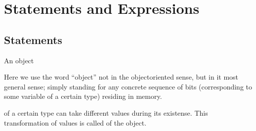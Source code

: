 \documentclass[a4paper,10pt,english]{jupyterBook}
\begin{document}
\begin{sphinxVerbatim}[commandchars=\\\{\}]


\end{sphinxVerbatim}

\ignorespaces 
\sphinxstepscope


\section{Statements and Expressions}
\label{\detokenize{text/progtut/statements:statements-and-expressions}}\label{\detokenize{text/progtut/statements::doc}}

\subsection{Statements}
\label{\detokenize{text/progtut/statements:statements}}
\sphinxAtStartPar
An object %
\begin{footnote}[1]\sphinxAtStartFootnote
Here we use the word “object” not in the object\sphinxhyphen{}oriented sense, but in it most general sense; simply standing for any concrete sequence of bits (corresponding to some variable of a certain type) residing in memory.
%
\end{footnote} of a certain type can take different values during its existense. This transformation of values is called  of the object.
\end{document}

